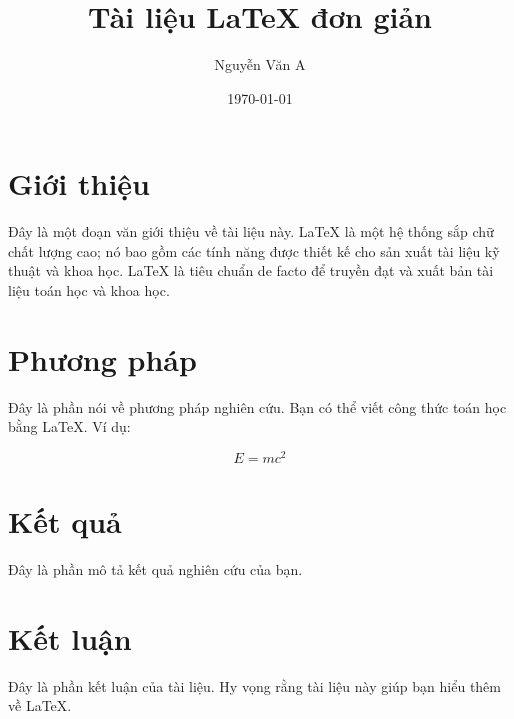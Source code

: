 \documentclass{article}
\title{Tài liệu LaTeX đơn giản}
\author{Nguyễn Văn A}
\date{\today}
\begin{document}
\maketitle

\section{Giới thiệu}

Đây là một đoạn văn giới thiệu về tài liệu này. LaTeX là một hệ thống sắp chữ chất lượng cao; nó bao gồm các tính năng được thiết kế cho sản xuất tài liệu kỹ thuật và khoa học. LaTeX là tiêu chuẩn de facto để truyền đạt và xuất bản tài liệu toán học và khoa học.

\section{Phương pháp}

Đây là phần nói về phương pháp nghiên cứu. Bạn có thể viết công thức toán học bằng LaTeX. Ví dụ:

\begin{equation}
E = mc^2
\end{equation}

\section{Kết quả}

Đây là phần mô tả kết quả nghiên cứu của bạn.

\section{Kết luận}

Đây là phần kết luận của tài liệu. Hy vọng rằng tài liệu này giúp bạn hiểu thêm về LaTeX.
\end{document}
